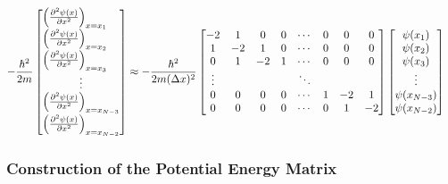 \begin{align*}
    -\frac{\hbar^2}{2m}
\begin{bmatrix}
    \Big(\frac{\partial^2 \psi(x)}{\partial x^2}\Big)_{x=x_1} \hspace{4mm} \\
    \Big(\frac{\partial^2 \psi(x)}{\partial x^2}\Big)_{x=x_2} \hspace{4mm} \\
    \Big(\frac{\partial^2 \psi(x)}{\partial x^2}\Big)_{x=x_3} \hspace{4mm} \\
    \vdots \\
    \Big(\frac{\partial^2 \psi(x)}{\partial x^2}\Big)_{x=x_{N-3}} \\
    \Big(\frac{\partial^2 \psi(x)}{\partial x^2}\Big)_{x=x_{N-2}}
\end{bmatrix}
&\approx
 -\frac{\hbar^2}{2m(\Delta x)^2}
\begin{bmatrix}
    -2 & 1 & 0 & 0 & \cdots & 0 & 0 & 0 \\
    1 & -2 & 1 & 0 & \cdots & 0 & 0 & 0 \\
    0 & 1 & -2 & 1 & \cdots & 0 & 0 & 0 \\
    \vdots & & & & \ddots & & \\
    0 & 0 & 0 & 0 & \cdots & 1 & -2 & 1 \\
    0 & 0 & 0 & 0 & \cdots & 0 & 1 & -2
\end{bmatrix}
\begin{bmatrix}
    \psi(x_1) \\ \psi(x_2) \\ \psi(x_3) \\ \vdots \\ \psi(x_{N-3}) \\ \psi(x_{N-2})
\end{bmatrix}
\end{align*}

\subsubsection{Construction of the Potential Energy Matrix}

